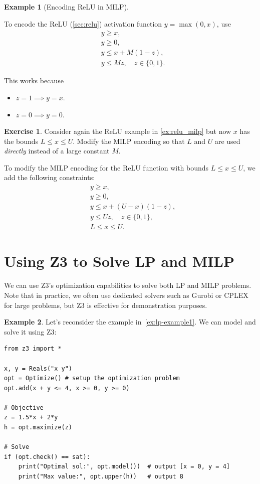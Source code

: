 \documentclass[oneside,11pt,dvipsnames]{book}
\numberwithin{equation}{section}
\theoremstyle{definition}
\newtheorem{example}{Example}[section]
\newtheorem{exercise}{Exercise}[section]
\newtheorem{solutione}{Solution}[section]
\theoremstyle{remark}
\newenvironment{solution}{%
  \ifbool{showsol}{%
    \begin{solutione}%
  }{%
    \comment %
  }%
}{%
  \ifbool{showsol}{%
    \end{solutione}%
  }{%
    \endcomment %
  }%
}
\begin{document}
\begin{example}[Encoding ReLU in MILP]\label{ex:relu_milp}

To encode the ReLU (\autoref{sec:relu}) activation function $y = \max(0, x)$, use
\[
\begin{aligned}
& y \geq x, \\
& y \geq 0, \\
& y \leq x + M(1-z), \\
& y \leq Mz, \quad z \in \{0,1\}.
\end{aligned}
\]

This works because 

\begin{itemize}
\item $z=1 \implies y=x$.    
\item $z=0 \implies y=0$.  
\end{itemize}


\end{example}
\begin{exercise}
Consider again the ReLU example in \autoref{ex:relu_milp} but now $x$ has the bounds $L \leq x \leq U$. Modify the MILP encoding so that $L$ and $U$ are used \emph{directly} instead of a large constant $M$.

\begin{solution}
To modify the MILP encoding for the ReLU function with bounds $L \leq x \leq U$, we add the following constraints:
\[
\begin{aligned}
& y \geq x, \\
& y \geq 0, \\
& y \leq x + (U-x)(1-z), \\
& y \leq Uz, \quad z \in \{0,1\}, \\
& L \leq x \leq U.
\end{aligned}
\]
\end{solution}
\end{exercise}


\section{Using Z3 to Solve LP and MILP}

We can use Z3's optimization capabilities to solve both LP and MILP problems. Note that in practice, we often use dedicated solvers such as Gurobi or CPLEX for large problems, but Z3 is effective for demonstration purposes.

\begin{example}
    Let's reconsider the example in~\autoref{ex:lp-example1}. We can model and solve it using Z3:

    \begin{lstlisting}
from z3 import *

x, y = Reals("x y")
opt = Optimize() # setup the optimization problem
opt.add(x + y <= 4, x >= 0, y >= 0)

# Objective
z = 1.5*x + 2*y
h = opt.maximize(z)

# Solve
if (opt.check() == sat): 
    print("Optimal sol:", opt.model())  # output [x = 0, y = 4]
    print("Max value:", opt.upper(h))   # output 8
    \end{lstlisting}
\end{example}
\end{document}
